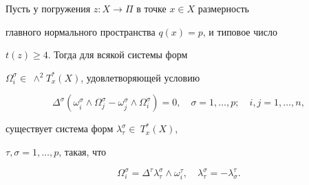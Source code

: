 \begin{lem}


Пусть у погружения $z:X\to\Pi$ в точке $x\in X$ размерность


главного нормального пространства $q(x)=p$, и типовое число


$t(z)\ge 4$. Тогда для всякой системы форм


$\Omega^{\sigma}_i\in~\wedge^2T^*_x(X)$, удовлетворяющей условию


\begin{equation}


\Delta^{\sigma}(\omega^{\sigma}_i\wedge\Omega^{\sigma}_j-


\omega^{\sigma}_j\wedge\Omega^{\sigma}_i)=0,\quad \sigma=1,\dotsc,p;


\quad i,j=1,\dotsc,n,


\end{equation}


существует система форм $\lambda^{\sigma}_{\tau}\in~T^*_x(X)$,


$\tau,\sigma=1,\dotsc,p$, такая, что


\begin{equation}


\Omega^{\sigma}_i=\Delta^{\tau}\lambda^{\sigma}_{\tau}


\wedge\omega^{\tau}_i,\quad \lambda^{\sigma}_{\tau}=-\lambda^{\tau}_{\sigma}.


\end{equation}


\end{lem}





